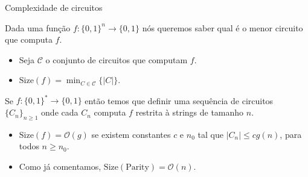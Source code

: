 \documentclass[landscape]{beamer}
\newcommand{\binalph}{\{0, 1\}}
\newcommand{\Size}{\text{Size}}
\newcommand{\Parity}{\text{Parity}}
\begin{document}

\begin{frame} {Complexidade de circuitos}

Dada uma função $f: \binalph^{n} \to \binalph$ nós queremos saber qual é o menor circuito que computa $f$.

\begin{itemize}

	\item Seja $\mathscr{C}$ o conjunto de circuitos que computam $f$.
	
	\item $\Size(f) = \min_{C \in \mathscr{C}}\{ \lvert C \rvert \}$.

\end{itemize}

Se $f: \binalph^{*} \to \binalph$ então temos que definir uma sequência de circuitos $\{C_{n}\}_{n \geq 1}$ onde cada $C_{n}$ computa $f$ restrita à strings de tamanho $n$.

\begin{itemize}

	\item $\Size(f) = \mathcal{O}(g)$ se existem constantes $c$ e $n_{0}$ tal que $\lvert C_{n} \rvert \leq cg(n)$, para todos $n \geq n_{0}$.
	
	\item Como já comentamos, $\Size(\Parity) = \mathcal{O}(n)$.

\end{itemize}

\end{frame}

\end{document}
